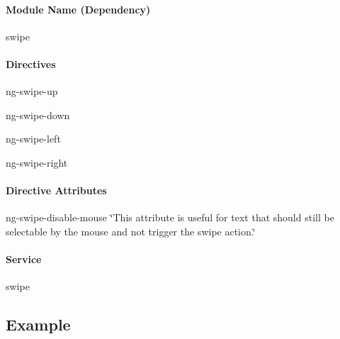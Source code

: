 \paragraph*{Module Name (Dependency)}


\begin{DoxyItemize}
\item swipe
\end{DoxyItemize}

\paragraph*{Directives}


\begin{DoxyItemize}
\item ng-\/swipe-\/up
\item ng-\/swipe-\/down
\item ng-\/swipe-\/left
\item ng-\/swipe-\/right
\end{DoxyItemize}

\paragraph*{Directive Attributes}

{\ttfamily ng-\/swipe-\/disable-\/mouse} \char`\"{}\+This attribute is useful for text that should still be selectable by the mouse and not trigger the swipe action.\char`\"{}

\paragraph*{Service}


\begin{DoxyItemize}
\item swipe
\end{DoxyItemize}

\subsection*{Example}

\begin{quote}


\end{quote}



